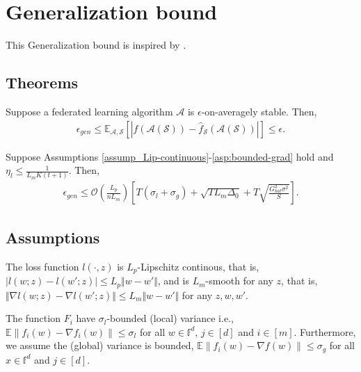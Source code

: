 \newpage
\section{Generalization bound}
This Generalization bound is inspired by \citet{sun2023understanding}.
\subsection{Theorems}

\begin{theorem} \label{thm_stability-gen}
    Suppose a federated learning algorithm $\mathcal{A}$ is $\epsilon$-on-averagely stable. Then,
    \begin{align*}
        \epsilon_{gen} \le \mathbb{E}_{\mathcal{A, S}} \left[ \left| f(\mathcal{A(S)}) - \hat{f}_{\mathcal{S}}(\mathcal{A(S)}) \right| \right] \le \epsilon.
    \end{align*}
\end{theorem}

\begin{theorem} \label{thm_gen-FedEve}
    Suppose Assumptions \ref{assump_Lip-continuous}-\ref{asp:bounded-grad} hold and $\eta_l \le \frac{1}{L_m K(t+1)}$. Then, 
    \begin{align*}    
        \epsilon_{gen} \le \mathcal{O}\left( \frac{L_p}{nL_m} \right) \left[ T (\sigma_{l} + \sigma_{g}) + \sqrt{T L_m \Delta_0} + T \sqrt{\frac{G_{kal}^2 \sigma^2}{S}} \right].
    \end{align*}
\end{theorem}

\subsection{Assumptions}
\begin{assumption}  \label{assump_Lip-continuous}
    The loss function $l(\cdot, z)$ is $L_p$-Lipschitz continous, that is,
    $|l(w; z) - l(w'; z) | \le L_p \Vert w - w' \Vert$, and is  
    $L_m$-smooth for any $z$, that is, 
    $\Vert \nabla l(w; z) - \nabla l(w';z) \Vert \le L_m \Vert w - w' \Vert$
    for any $z, w, w'$.
\end{assumption}

\begin{assumption}
    The function $F_i$ have $\sigma_l$-bounded (local) variance i.e., 
    $\mathbb{E}\|f_i(w) - \nabla f_i(w)\| \leq \sigma_{l}$ for all $w \in \mathbb{f}^d$, $j \in [d]$ and $i \in [m]$. Furthermore, we assume the (global) variance is bounded,
    $\mathbb{E}\|f_i(w) - \nabla f(w)\| \leq \sigma_{g}$
    for all $x \in \mathbb{f}^d$ and $j \in [d]$.
    \label{asp:variance}
\end{assumption}
    
